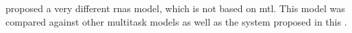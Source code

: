 
 proposed a very different
\glspl{rna} model, which is not based on \gls{mtl}. This
model was compared against other multitask models as well as the system proposed in this \thesisdiss{}.
